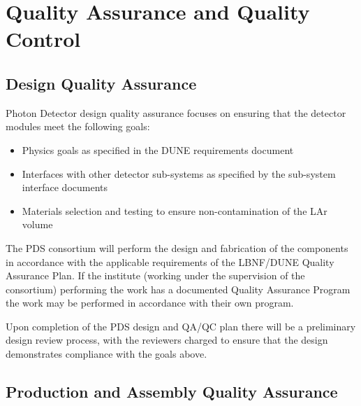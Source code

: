 \section{Quality Assurance and Quality Control}
\label{sec:fdsp-pd-qaqc}




\subsection{Design Quality Assurance}
\label{sec:fdsp-pd-designqa}

Photon Detector design quality assurance focuses on ensuring that the detector modules meet the following goals:
\begin{itemize}
\item Physics goals as specified in the DUNE requirements document
\item Interfaces with other detector sub-systems as specified by the sub-system interface documents
\item Materials selection and testing to ensure non-contamination of the LAr volume
\end{itemize}

The PDS consortium will perform the design and fabrication of the components in accordance with the applicable requirements of the LBNF/DUNE Quality Assurance Plan. If the institute (working under the supervision of the consortium) performing the work has a documented Quality Assurance Program the work may be performed in accordance with their own program.

Upon completion of the PDS design and QA/QC plan there will be a preliminary design review process, with the reviewers charged to ensure that the design demonstrates compliance with the goals above.

\subsection{Production and Assembly Quality Assurance}
\label{sec:fdsp-pd-prodqa}

